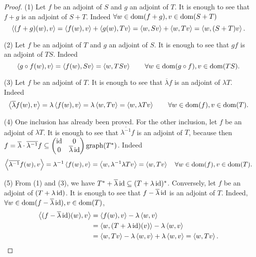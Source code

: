 \begin{proof}
(1) Let $f$ be an adjoint of $S$ and $g$ an adjoint of $T$. It is enough to see that $f+g$ is an adjoint of $S+T$. Indeed $\forall w\in \operatorname{dom}(f + g), v\in \operatorname{dom}(S+T)$
\[ \left\langle (f + g)(w), v \right\rangle = \left\langle f(w),v \right\rangle + \left\langle g(w), Tv \right\rangle = \left\langle w,Sv \right\rangle + \left\langle w,Tv \right\rangle = \left\langle w,(S+T)v \right\rangle. \]

(2) Let $f$ be an adjoint of $T$ and $g$ an adjoint of $S$. It is enough to see that $gf$ is an adjoint of $TS$. Indeed
\[ \left\langle g\circ f(w), v \right\rangle = \left\langle f(w), Sv \right\rangle = \left\langle w,TSv \right\rangle \qquad \forall w\in \operatorname{dom}(g\circ f), v\in \operatorname{dom}(TS). \] 

(3) Let $f$ be an adjoint of $T$. It is enough to see that $\overline{\lambda}f$ is an adjoint of $\lambda T$. Indeed
\[ \left\langle \overline{\lambda}f(w), v \right\rangle = \lambda\left\langle f(w), v \right\rangle = \lambda\left\langle w,Tv \right\rangle = \left\langle w,\lambda Tv \right\rangle \qquad \forall w\in \operatorname{dom}(f), v\in \operatorname{dom}(T). \]

(4) One inclusion has already been proved. For the other inclusion, let $f$ be an adjoint of $\lambda T$. It is enough to see that $\overline{\lambda^{-1}}f$ is an adjoint of $T$, because then $f = \overline{\lambda}\cdot\overline{\lambda^{-1}}f \subseteq \begin{pmatrix}
\operatorname{id} & 0 \\ 0 & \overline{\lambda}\operatorname{id}
\end{pmatrix} \operatorname{graph}(T^*)$. Indeed
\[ \left\langle \overline{\lambda^{-1}}f(w), v \right\rangle = \lambda^{-1}\left\langle f(w),v \right\rangle = \left\langle w,\lambda^{-1}\lambda Tv \right\rangle = \left\langle w,Tv \right\rangle \quad \forall w\in \operatorname{dom}(f), v\in \operatorname{dom}(T). \]

(5) From (1) and (3), we have $T^*+\overline{\lambda}\operatorname{id} \subseteq (T+\lambda\operatorname{id})^*$. Conversely, let $f$ be an adjoint of $(T+\lambda\operatorname{id})$. It is enough to see that $f-\overline{\lambda}\operatorname{id}$ is an adjoint of $T$. Indeed, $\forall w\in\operatorname{dom}(f-\overline{\lambda}\operatorname{id}), v\in \operatorname{dom}(T)$,
\begin{align*}
\left\langle (f-\overline{\lambda}\operatorname{id})(w),v \right\rangle &= \left\langle f(w),v \right\rangle-\lambda \left\langle w,v \right\rangle \\
&= \left\langle w,(T+\lambda\operatorname{id})(v) \right\rangle-\lambda \left\langle w,v \right\rangle \\
&= \left\langle w,Tv \right\rangle - \lambda\left\langle w,v \right\rangle + \lambda\left\langle w,v \right\rangle = \left\langle w,Tv \right\rangle.
\end{align*}
\end{proof}

